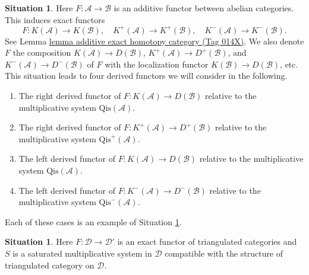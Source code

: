 \documentclass{amsart}
\theoremstyle{plain}
\theoremstyle{definition}
\newtheorem{situation}[subsection]{Situation}
\theoremstyle{remark}
\numberwithin{equation}{subsection}
\begin{document}
\begin{situation}
\label{situation-classical}
Here $F : \mathcal{A} \to \mathcal{B}$ is an additive functor between
abelian categories. This induces exact functors
$$
F : K(\mathcal{A}) \to K(\mathcal{B}), \quad
K^{+}(\mathcal{A}) \to K^{+}(\mathcal{B}), \quad
K^{-}(\mathcal{A}) \to K^{-}(\mathcal{B}).
$$
See Lemma \href{https://stacks.math.columbia.edu/tag/014X}{lemma additive exact homotopy category (Tag 014X)}.
We also denote $F$ the composition $K(\mathcal{A}) \to D(\mathcal{B})$,
$K^{+}(\mathcal{A}) \to D^{+}(\mathcal{B})$, and
$K^{-}(\mathcal{A}) \to D^-(\mathcal{B})$ of $F$ with the localization
functor $K(\mathcal{B}) \to D(\mathcal{B})$, etc. This situation leads
to four derived functors we will consider in the following.
\begin{enumerate}
\item The right derived functor of
$F : K(\mathcal{A}) \to D(\mathcal{B})$
relative to the multiplicative system $\text{Qis}(\mathcal{A})$.
\item The right derived functor of
$F : K^{+}(\mathcal{A}) \to D^{+}(\mathcal{B})$
relative to the multiplicative system $\text{Qis}^{+}(\mathcal{A})$.
\item The left derived functor of
$F : K(\mathcal{A}) \to D(\mathcal{B})$
relative to the multiplicative system $\text{Qis}(\mathcal{A})$.
\item The left derived functor of
$F : K^{-}(\mathcal{A}) \to D^{-}(\mathcal{B})$
relative to the multiplicative system $\text{Qis}^-(\mathcal{A})$.
\end{enumerate}
Each of these cases is an example of
Situation \ref{situation-derived-functor}.
\end{situation}

\begin{situation}
\label{situation-derived-functor}
Here $F : \mathcal{D} \to \mathcal{D}'$ is an exact functor of triangulated
categories and $S$ is a saturated multiplicative
system in $\mathcal{D}$ compatible with the structure
of triangulated category on $\mathcal{D}$.
\end{situation}
\end{document}
